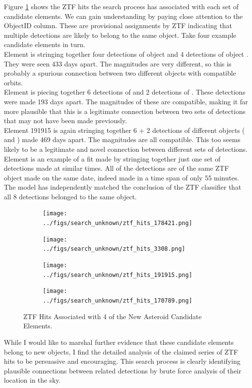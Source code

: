 Figure \ref{fig:ZtfHits} shows the ZTF hits the search process has associated with each set of candidate elements.
We can gain understanding by paying close attention to the ObjectID column.
These are provisional assignments by ZTF indicating that multiple detections are likely to belong to the same object.
Take four example candidate elements in turn.  \\
Element  is stringing together four detections of object  and 4 detections of object .
They were seen 433 days apart.  
The magnitudes are very different, so this is probably a spurious connection between two different objects with compatible orbits.\\
Element  is piecing together 6 detections of  and 2 detections of .
These detections were made 193 days apart.
The magnitudes of these are compatible, making it far more plausible that this is a legitimate connection between 
two sets of detections that may not have been made previously. \\
Element 191915 is again stringing together 6 + 2 detections of different objects ( and )
made 469 days apart.  The magnitudes are all compatible.  
This too seems likely to be a legitimate and novel connection between different sets of detections. \\
Element  is an example of a fit made by stringing together just one set of detections
made at similar times.  All of the detections are of the same ZTF object  made on the same date,
indeed made in a time span of only 55 minutes.
The model has independently matched the conclusion of the ZTF classifier that all 8 detections belonged to the same object.
\begin{figure}[h]
\begin{subfigure}[t]{0.45\textwidth}
\centering
\texttt{[image: ../figs/search\_unknown/ztf\_hits\_178421.png]}
\end{subfigure}
\hfill
\begin{subfigure}[t]{0.45\textwidth}
\centering
\texttt{[image: ../figs/search\_unknown/ztf\_hits\_3308.png]}
\end{subfigure}
\bigskip
\begin{subfigure}[t]{0.45\textwidth}
\centering
\texttt{[image: ../figs/search\_unknown/ztf\_hits\_191915.png]}
\end{subfigure}
\hfill
\begin{subfigure}[t]{0.45\textwidth}
\centering
\texttt{[image: ../figs/search\_unknown/ztf\_hits\_170789.png]}
\end{subfigure}
\caption[ZTF Hits Associated with 4 of the New Asteroid Candidate Elements]
{ZTF Hits Associated with 4 of the New Asteroid Candidate Elements.}
\label{fig:ZtfHits}
\end{figure}
While I would like to marshal further evidence that these candidate elements belong to new objects,
I find the detailed analysis of the claimed series of ZTF hits to be persuasive and encouraging.
This search process is clearly identifying plausible connections between related detections 
by brute force analysis of their location in the sky.

